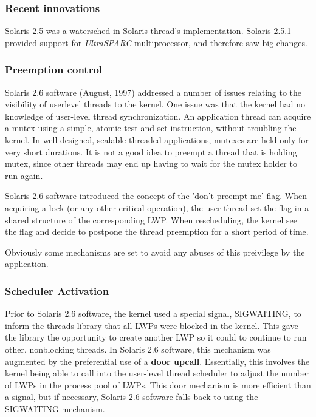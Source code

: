 
\begin{frame}
\frametitle{Recent innovations}

Solaris 2.5 was a watersched in Solaris thread's implementation. Solaris 2.5.1 provided support for \textit{UltraSPARC} multiprocessor, and therefore saw big changes.

\end{frame}


\begin{frame}
\frametitle{Preemption control}

Solaris 2.6 software (August, 1997) addressed a number of issues relating to the visibility of userlevel threads to the kernel. One issue was that the kernel had no knowledge of user-level thread synchronization. An application thread can acquire a mutex using a simple, atomic test-and-set instruction, without troubling the kernel. In well-designed, scalable threaded applications, mutexes are held only for very short durations. It is not a good idea to preempt a thread that  is holding mutex, since other threads may end up having to wait for the mutex holder to run again.

\-

Solaris 2.6 software introduced the concept of the 'don't preempt me' flag. When acquiring a lock (or any other critical operation), the user thread set the flag in a shared structure of the corresponding LWP. When rescheduling, the kernel see the flag and decide to postpone the thread preemption for a short period of time.

\-

Obviously some mechanisms are set to avoid any abuses of this preivilege by the application.

\end{frame}


\begin{frame}
\frametitle{Scheduler Activation}

Prior to Solaris 2.6 software, the kernel used a special signal, SIGWAITING, to inform the threads library that all LWPs were blocked in the kernel. This gave the library the opportunity to create another LWP so it could to continue to run other, nonblocking threads. In Solaris 2.6 software, this mechanism was augmented by the preferential use of a \textbf{door upcall}. Essentially, this involves the kernel being able to call into the user-level thread scheduler to adjust the number of LWPs in the process pool of LWPs. This door mechanism is more efficient than a signal, but if necessary, Solaris 2.6 software falls back to using the SIGWAITING mechanism.

\end{frame}

